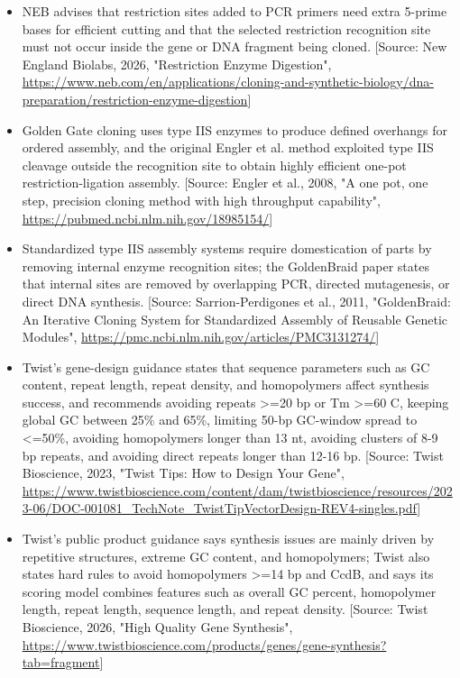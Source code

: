 \documentclass[11pt]{report}
\begin{document}
\begin{itemize}
\item NEB advises that restriction sites added to PCR primers need extra 5-prime bases for efficient cutting and that the selected restriction recognition site must not occur inside the gene or DNA fragment being cloned. [Source: New England Biolabs, 2026, "Restriction Enzyme Digestion", \url{https://www.neb.com/en/applications/cloning-and-synthetic-biology/dna-preparation/restriction-enzyme-digestion}]
\item Golden Gate cloning uses type IIS enzymes to produce defined overhangs for ordered assembly, and the original Engler et al. method exploited type IIS cleavage outside the recognition site to obtain highly efficient one-pot restriction-ligation assembly. [Source: Engler et al., 2008, "A one pot, one step, precision cloning method with high throughput capability", \url{https://pubmed.ncbi.nlm.nih.gov/18985154/}]
\item Standardized type IIS assembly systems require domestication of parts by removing internal enzyme recognition sites; the GoldenBraid paper states that internal sites are removed by overlapping PCR, directed mutagenesis, or direct DNA synthesis. [Source: Sarrion-Perdigones et al., 2011, "GoldenBraid: An Iterative Cloning System for Standardized Assembly of Reusable Genetic Modules", \url{https://pmc.ncbi.nlm.nih.gov/articles/PMC3131274/}]
\item Twist's gene-design guidance states that sequence parameters such as GC content, repeat length, repeat density, and homopolymers affect synthesis success, and recommends avoiding repeats >=20 bp or Tm >=60 C, keeping global GC between 25\% and 65\%, limiting 50-bp GC-window spread to <=50\%, avoiding homopolymers longer than 13 nt, avoiding clusters of 8-9 bp repeats, and avoiding direct repeats longer than 12-16 bp. [Source: Twist Bioscience, 2023, "Twist Tips: How to Design Your Gene", \url{https://www.twistbioscience.com/content/dam/twistbioscience/resources/2023-06/DOC-001081_TechNote_TwistTipVectorDesign-REV4-singles.pdf}]
\item Twist's public product guidance says synthesis issues are mainly driven by repetitive structures, extreme GC content, and homopolymers; Twist also states hard rules to avoid homopolymers >=14 bp and CcdB, and says its scoring model combines features such as overall GC percent, homopolymer length, repeat length, sequence length, and repeat density. [Source: Twist Bioscience, 2026, "High Quality Gene Synthesis", \url{https://www.twistbioscience.com/products/genes/gene-synthesis?tab=fragment}]

\end{itemize}
\end{document}
